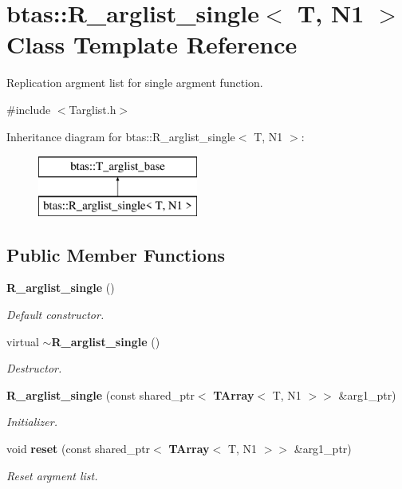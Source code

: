\section{btas\-:\-:R\-\_\-arglist\-\_\-single$<$ T, N1 $>$ Class Template Reference}
\label{d5/d3b/classbtas_1_1R__arglist__single}


Replication argment list for single argment function.  




{\ttfamily \#include $<$Targlist.\-h$>$}

Inheritance diagram for btas\-:\-:R\-\_\-arglist\-\_\-single$<$ T, N1 $>$\-:\begin{figure}[H]
\begin{center}
\leavevmode
\includegraphics[height=2.000000cm]{d5/d3b/classbtas_1_1R__arglist__single}
\end{center}
\end{figure}
\subsection*{Public Member Functions}
\begin{DoxyCompactItemize}
\item 
{\bf R\-\_\-arglist\-\_\-single} ()
\begin{DoxyCompactList}\small\item\em Default constructor. \end{DoxyCompactList}\item 
virtual {\bf $\sim$\-R\-\_\-arglist\-\_\-single} ()
\begin{DoxyCompactList}\small\item\em Destructor. \end{DoxyCompactList}\item 
{\bf R\-\_\-arglist\-\_\-single} (const shared\-\_\-ptr$<$ {\bf T\-Array}$<$ T, N1 $>$$>$ \&arg1\-\_\-ptr)
\begin{DoxyCompactList}\small\item\em Initializer. \end{DoxyCompactList}\item 
void {\bf reset} (const shared\-\_\-ptr$<$ {\bf T\-Array}$<$ T, N1 $>$$>$ \&arg1\-\_\-ptr)
\begin{DoxyCompactList}\small\item\em Reset argment list. \end{DoxyCompactList}\end{DoxyCompactItemize}
